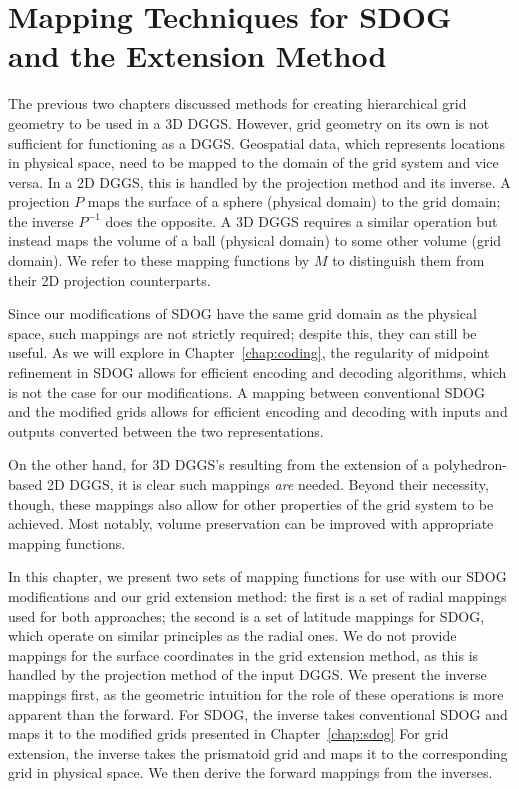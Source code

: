 \chapter{Mapping Techniques for SDOG and the Extension Method} \label{chap:mapping}
The previous two chapters discussed methods for creating hierarchical grid geometry to be used in a 3D DGGS.
However, grid geometry on its own is not sufficient for functioning as a DGGS.
Geospatial data, which represents locations in physical space, need to be mapped to the domain of the grid system and vice versa.
In a 2D DGGS, this is handled by the projection method and its inverse.
A projection $P$ maps the surface of a sphere (physical domain) to the grid domain; the inverse $P^{-1}$ does the opposite.
A 3D DGGS requires a similar operation but instead maps the volume of a ball (physical domain) to some other volume (grid domain).
We refer to these mapping functions by $M$ to distinguish them from their 2D projection counterparts.


Since our modifications of SDOG have the same grid domain as the physical space, such mappings are not strictly required; despite this, they can still be useful.
As we will explore in Chapter~\ref{chap:coding}, the regularity of midpoint refinement in SDOG allows for efficient encoding and decoding algorithms, which is not the case for our modifications.
A mapping between conventional SDOG and the modified grids allows for efficient encoding and decoding with inputs and outputs converted between the two representations.


On the other hand, for 3D DGGS's resulting from the extension of a polyhedron-based 2D DGGS, it is clear such mappings \textit{are} needed.
Beyond their necessity, though, these mappings also allow for other properties of the grid system to be achieved. Most notably, volume preservation can be improved with appropriate mapping functions.


In this chapter, we present two sets of mapping functions for use with our SDOG modifications and our grid extension method:
the first is a set of radial mappings used for both approaches;
the second is a set of latitude mappings for SDOG, which operate on similar principles as the radial ones.
We do not provide mappings for the surface coordinates in the grid extension method, as this is handled by the projection method of the input DGGS.
We present the inverse mappings first, as the geometric intuition for the role of these operations is more apparent than the forward.
For SDOG, the inverse takes conventional SDOG and maps it to the modified grids presented in Chapter~\ref{chap:sdog}
For grid extension, the inverse takes the prismatoid grid and maps it to the corresponding grid in physical space.
We then derive the forward mappings from the inverses. 



